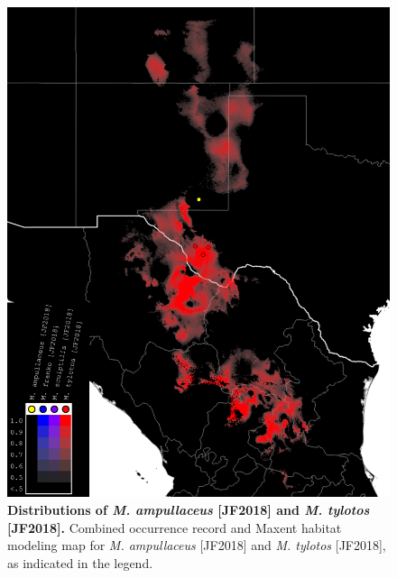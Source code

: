 \documentclass[fleqn,10pt,lineno]{wlpeerj} %
\begin{document}
\begin{figure}[h]
	\centering
	\includegraphics[width=\textwidth]{figure36.png}
	\caption{\textbf{Distributions of \textit{M. ampullaceus} [JF2018] and \textit{M. tylotos} [JF2018].} Combined occurrence record and Maxent habitat modeling map for \textit{M. ampullaceus} [JF2018] and \textit{M. tylotos} [JF2018], as indicated in the legend.}
	\label{fig:map_amptyl}
\end{figure}
\end{document}
